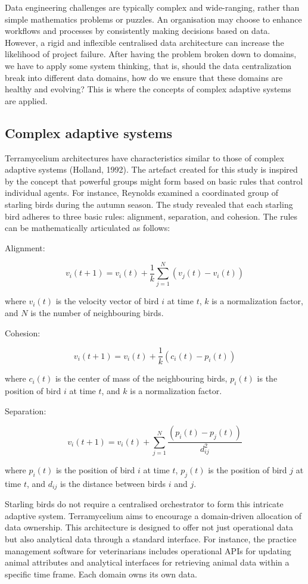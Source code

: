 \documentclass[preprint,12pt]{elsarticle}
\begin{document}
Data engineering challenges are typically complex and wide-ranging, rather than simple mathematics problems or puzzles. An organisation may choose to enhance workflows and processes by consistently making decisions based on data. However, a rigid and inflexible centralised data architecture can increase the likelihood of project failure. After having the problem broken down to domains, we have to apply some system thinking, that is, should the data centralization break into different data domains, how do we ensure that these domains are healthy and evolving? This is where the concepts of complex adaptive systems are applied.

\subsection{Complex adaptive systems}

Terramycelium architectures have characteristics similar to those of complex adaptive systems (Holland, 1992). The artefact created for this study is inspired by the concept that powerful groups might form based on basic rules that control individual agents. For instance, Reynolds \cite{reynolds1987flocks} examined a coordinated group of starling birds during the autumn season. The study revealed that each starling bird adheres to three basic rules: alignment, separation, and cohesion. The rules can be mathematically articulated as follows:

Alignment:

$$ v_i(t+1) = v_i(t) + \frac{1}{k} \sum_{j=1}^{N} (v_j(t) - v_i(t)) $$

where $v_i(t)$ is the velocity vector of bird $i$ at time $t$, $k$ is a normalization factor, and $N$ is the number of neighbouring birds.

Cohesion:

$$ v_i(t+1) = v_i(t) + \frac{1}{k} (c_i(t) - p_i(t)) $$

where $c_i(t)$ is the center of mass of the neighbouring birds, $p_i(t)$ is the position of bird $i$ at time $t$, and $k$ is a normalization factor.

Separation:

$$ v_i(t+1) = v_i(t) + \sum_{j=1}^{N} \frac{(p_i(t) - p_j(t))}{d_{ij}^2} $$

where $p_i(t)$ is the position of bird $i$ at time $t$, $p_j(t)$ is the position of bird $j$ at time $t$, and $d_{ij}$ is the distance between birds $i$ and $j$.

Starling birds do not require a centralised orchestrator to form this intricate adaptive system. Terramycelium aims to encourage a domain-driven allocation of data ownership. This architecture is designed to offer not just operational data but also analytical data through a standard interface. For instance, the practice management software for veterinarians includes operational APIs for updating animal attributes and analytical interfaces for retrieving animal data within a specific time frame. Each domain owns its own data.
\end{document}
